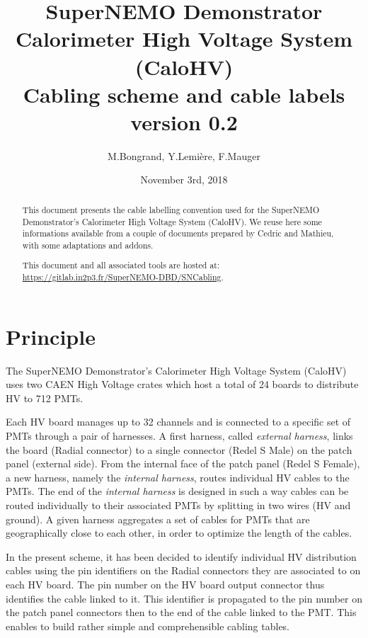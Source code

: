 \documentclass[12pt,a4paper]{article}
\title{SuperNEMO Demonstrator\\
  Calorimeter High Voltage System (CaloHV)\\
  Cabling scheme and cable labels\\
  version 0.2}
\author{M.Bongrand, Y.Lemi\`ere, F.Mauger}
\date{November 3rd, 2018}
\begin{document}
\maketitle

\begin{abstract}
  \noindent This document presents the cable labelling convention used
  for  the SuperNEMO  Demonstrator's Calorimeter  High Voltage  System
  (CaloHV).  We reuse  here some informations available  from a couple
  of documents prepared  by Cedric and Mathieu,  with some adaptations
  and addons.

  \vskip 10pt
  \noindent This document and all associated tools
  are hosted at:
  \vskip 5pt
  \url{https://gitlab.in2p3.fr/SuperNEMO-DBD/SNCabling}.
  
\end{abstract}

\tableofcontents
\vfill

\clearpage
\section{Principle}

The SuperNEMO Demonstrator's Calorimeter  High Voltage System (CaloHV)
uses two CAEN High  Voltage crates which host a total  of 24 boards to
distribute HV to 712 PMTs.

Each HV board manages up to 32 channels and is connected to a specific
set of  PMTs through  a pair  of harnesses.   A first  harness, called
\emph{external  harness},  links the  board  (Radial  connector) to  a
single  connector  (Redel  S  Male)   on  the  patch  panel  (external
side). From the  internal face of the patch panel  (Redel S Female), a
new harness, namely the  \emph{internal harness}, routes individual HV
cables  to  the PMTs.   The  end  of  the \emph{internal  harness}  is
designed in  such a  way cables  can be  routed individually  to their
associated PMTs  by splitting in two  wires (HV and ground).   A given
harness aggregates  a set of  cables for PMTs that  are geographically
close to each other, in order to optimize the length of the cables.

In the present  scheme, it has been decided to  identify individual HV
distribution cables using the pin identifiers on the Radial connectors
they are  associated to on  each HV board.  The  pin number on  the HV
board output connector  thus identifies the cable linked  to it.  This
identifier  is  propagated  to  the  pin number  on  the  patch  panel
connectors  then to  the end  of the  cable linked  to the  PMT.  This
enables to build rather simple and comprehensible cabling tables.
\end{document}
